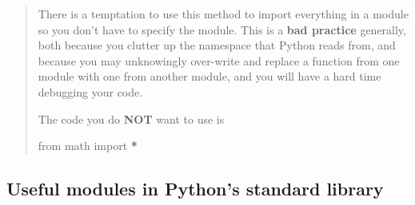 \documentclass[
  letterpaper,
]{scrbook}
\newenvironment{Shaded}{\begin{snugshade}}{\end{snugshade}}
\newcommand{\ImportTok}[1]{#1}
\newcommand{\NormalTok}[1]{#1}
\newcommand{\OperatorTok}[1]{\textcolor[rgb]{0.81,0.36,0.00}{\textbf{#1}}}
\begin{document}
\begin{quote}
There is a temptation to use this method to import everything in a module so you don't have to specify the module. This is a \textbf{bad practice} generally, both because you clutter up the namespace that Python reads from, and because you may unknowingly over-write and replace a function from one module with one from another module, and you will have a hard time debugging your code.

The code you do \textbf{NOT} want to use is

\begin{Shaded}
\begin{Highlighting}[]
\ImportTok{from}\NormalTok{ math }\ImportTok{import} \OperatorTok{*}
\end{Highlighting}
\end{Shaded}
\end{quote}

\hypertarget{useful-modules-in-pythons-standard-library}{%
\subsection{Useful modules in Python's standard library}\label{useful-modules-in-pythons-standard-library}}
\end{document}
